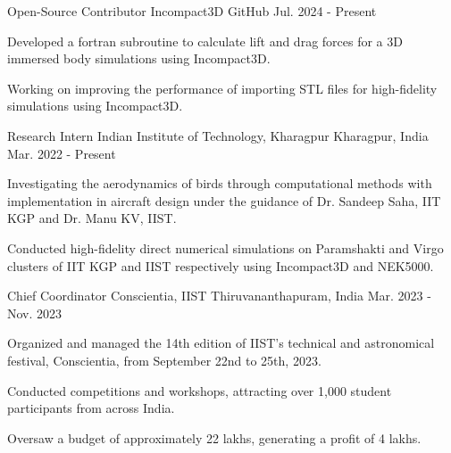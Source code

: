 

\begin{cventries}
  \cventry
  {Open-Source Contributor} %
  {Incompact3D} %
  {GitHub} %
  {Jul. 2024 - Present} %
  {
    \begin{cvitems} %
      \item {Developed a fortran subroutine to calculate lift and drag forces for a 3D immersed body simulations using Incompact3D.}
      \item {Working on improving the performance of importing STL files for high-fidelity simulations using Incompact3D.}
    \end{cvitems}
  }

  \cventry
  {Research Intern} %
  {Indian Institute of Technology, Kharagpur} %
  {Kharagpur, India} %
  {Mar. 2022 - Present} %
  {
    \begin{cvitems} %
      \item {Investigating the aerodynamics of birds through computational methods with implementation in aircraft design under the guidance of Dr. Sandeep Saha, IIT KGP and Dr. Manu KV, IIST.}
      \item {Conducted high-fidelity direct numerical simulations on Paramshakti and Virgo clusters of IIT KGP and IIST respectively using Incompact3D and NEK5000.}
    \end{cvitems}
  }

  \cventry
  {Chief Coordinator} %
  {Conscientia, IIST} %
  {Thiruvananthapuram, India} %
  {Mar. 2023 - Nov. 2023} %
  {
    \begin{cvitems} %
      \item {Organized and managed the 14th edition of IIST's technical and astronomical festival, Conscientia, from September 22nd to 25th, 2023.}
      \item {Conducted competitions and workshops, attracting over 1,000 student participants from across India.}
      \item {Oversaw a budget of approximately 22 lakhs, generating a profit of 4 lakhs.}
    \end{cvitems}
  }


\end{cventries}
